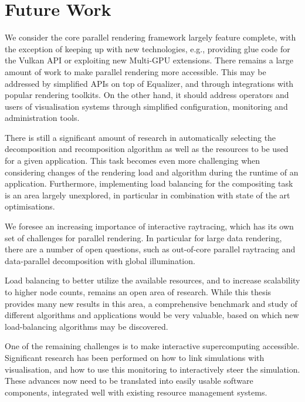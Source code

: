 \section{Future Work}

We consider the core parallel rendering framework largely feature complete,
with the exception of keeping up with new technologies, e.g., providing glue
code for the Vulkan API or exploiting new Multi-GPU extensions. There remains a
large amount of work to make parallel rendering more accessible. This may be
addressed by simplified APIs on top of Equalizer, and through integrations with
popular rendering toolkits. On the other hand, it should address operators and
users of visualisation systems through simplified configuration, monitoring and
administration tools.

There is still a significant amount of research in automatically selecting the
decomposition and recomposition algorithm as well as the resources to be used
for a given application. This task becomes even more challenging when
considering changes of the rendering load and algorithm during the runtime of
an application. Furthermore, implementing load balancing for the compositing
task is an area largely unexplored, in particular in combination with state
of the art optimisations.

We foresee an increasing importance of interactive raytracing, which has its
own set of challenges for parallel rendering. In particular for large data
rendering, there are a number of open questions, such as out-of-core parallel
raytracing and data-parallel decomposition with global illumination.

Load balancing to better utilize the available resources, and to increase
scalability to higher node counts, remains an open area of research. While this
thesis provides many new results in this area, a comprehensive benchmark and
study of different algorithms and applications would be very valuable, based on
which new load-balancing algorithms may be discovered.

One of the remaining challenges is to make interactive supercomputing
accessible. Significant research has been performed on how to link simulations
with visualisation, and how to use this monitoring to interactively steer the
simulation. These advances now need to be translated into easily usable
software components, integrated well with existing resource management systems.
